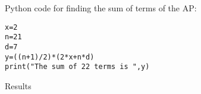 \documentclass[journal,12pt,twocolumn]{IEEEtran}
\theoremstyle{remark}
\begin{document}
\begin{enumerate}
Python code for finding the sum of terms of the AP:
\begin{lstlisting}
x=2
n=21
d=7
y=((n+1)/2)*(2*x+n*d)
print("The sum of 22 terms is ",y)
\end{lstlisting}

\begin{table}[h!]
\centering

\vspace{0.5cm}
\caption{\normalsize Results}
\end{table}


\end{enumerate}
\end{document}

